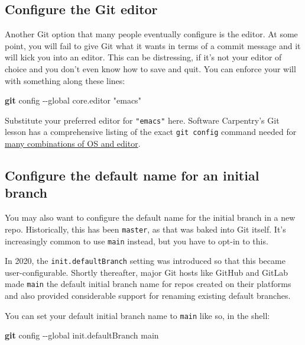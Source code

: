 \documentclass[
]{book}
\newenvironment{Shaded}{\begin{snugshade}}{\end{snugshade}}
\newcommand{\AttributeTok}[1]{\textcolor[rgb]{0.13,0.29,0.53}{#1}}
\newcommand{\FunctionTok}[1]{\textcolor[rgb]{0.13,0.29,0.53}{\textbf{#1}}}
\newcommand{\NormalTok}[1]{#1}
\newcommand{\StringTok}[1]{\textcolor[rgb]{0.31,0.60,0.02}{#1}}
\begin{document}
\subsection{Configure the Git editor}\label{git-editor}

Another Git option that many people eventually configure is the editor. At some point, you will fail to give Git what it wants in terms of a commit message and it will kick you into an editor. This can be distressing, if it's not your editor of choice and you don't even know how to save and quit. You can enforce your will with something along these lines:

\begin{Shaded}
\begin{Highlighting}[]
\FunctionTok{git}\NormalTok{ config }\AttributeTok{{-}{-}global}\NormalTok{ core.editor }\StringTok{"emacs"}
\end{Highlighting}
\end{Shaded}

Substitute your preferred editor for \texttt{"emacs"} here. Software Carpentry's Git lesson has a comprehensive listing of the exact \texttt{git\ config} command needed for \href{https://swcarpentry.github.io/git-novice/02-setup.html}{many combinations of OS and editor}.

\subsection{Configure the default name for an initial branch}\label{configure-the-default-name-for-an-initial-branch}

You may also want to configure the default name for the initial branch in a new repo.
Historically, this has been \texttt{master}, as that was baked into Git itself.
It's increasingly common to use \texttt{main} instead, but you have to opt-in to this.

In 2020, the \texttt{init.defaultBranch} setting was introduced so that this became user-configurable.
Shortly thereafter, major Git hosts like GitHub and GitLab made \texttt{main} the default initial branch name for repos created on their platforms and also provided considerable support for renaming existing default branches.

You can set your default initial branch name to \texttt{main} like so, in the shell:

\begin{Shaded}
\begin{Highlighting}[]
\FunctionTok{git}\NormalTok{ config }\AttributeTok{{-}{-}global}\NormalTok{ init.defaultBranch main}
\end{Highlighting}
\end{Shaded}
\end{document}
